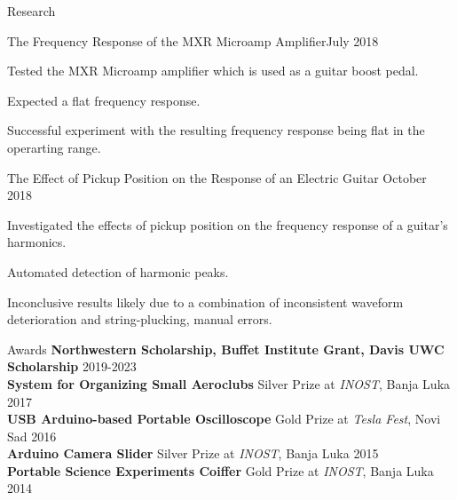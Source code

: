 \documentclass{resume}
\begin{document}
\begin{rSection}{Research}
    \begin{rSubsection}
        {The Frequency Response of the MXR Microamp Amplifier}{July 2018}
        {}{}
        \item Tested the MXR Microamp amplifier which is used as a guitar
            boost pedal.
        \item Expected a flat frequency response.
        \item Successful experiment with the resulting frequency response being
            flat in the operarting range.
    \end{rSubsection}

    \begin{rSubsection}
        {The Effect of Pickup Position on the Response of an Electric Guitar}
        {October 2018}{}{}
        \item Investigated the effects of pickup position on the frequency
            response of a guitar's harmonics.
        \item Automated detection of harmonic peaks.
        \item Inconclusive results likely due to a combination of inconsistent
            waveform deterioration and string-plucking, manual errors.
    \end{rSubsection}
\end{rSection}

\begin{rSection}{Awards}
    {\bf Northwestern Scholarship, Buffet Institute Grant, Davis UWC Scholarship}
    \hfill {2019-2023} \\
    {\bf System for Organizing Small Aeroclubs}
    \hfill {Silver Prize at \textit{INOST}, Banja Luka 2017} \\
    {\bf USB Arduino-based Portable Oscilloscope}
        \hfill {Gold Prize at \textit{Tesla Fest}, Novi Sad 2016} \\
    {\bf Arduino Camera Slider}
        \hfill {Silver Prize at \textit{INOST}, Banja Luka 2015} \\
    {\bf Portable Science Experiments Coiffer}
        \hfill {Gold Prize at \textit{INOST}, Banja Luka 2014}
\end{rSection}
\end{document}
